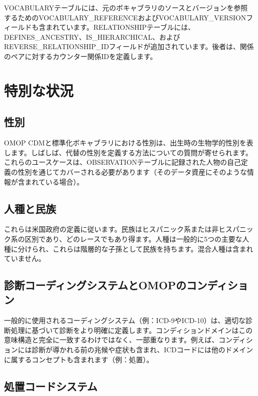 \documentclass[
  11pt]{book}
\theoremstyle{definition}
\theoremstyle{definition}
\theoremstyle{definition}
\theoremstyle{definition}
\theoremstyle{remark}
\begin{document}
VOCABULARYテーブルには、元のボキャブラリのソースとバージョンを参照するためのVOCABULARY\_REFERENCEおよびVOCABULARY\_VERSIONフィールドも含まれています。RELATIONSHIPテーブルには、DEFINES\_ANCESTRY、IS\_HIERARCHICAL、およびREVERSE\_RELATIONSHIP\_IDフィールドが追加されています。後者は、関係のペアに対するカウンター関係IDを定義します。

\section{特別な状況}\label{specialSituations}

\subsection{性別}\label{ux6027ux5225}

OMOP CDMと標準化ボキャブラリにおける性別は、出生時の生物学的性別を表します。しばしば、代替の性別を定義する方法についての質問が寄せられます。これらのユースケースは、OBSERVATIONテーブルに記録された人物の自己定義の性別を通じてカバーされる必要があります（そのデータ資産にそのような情報が含まれている場合）。

\subsection{人種と民族}\label{ux4ebaux7a2eux3068ux6c11ux65cf}

これらは米国政府の定義に従います。民族はヒスパニック系または非ヒスパニック系の区別であり、どのレースでもあり得ます。人種は一般的に5つの主要な人種に分けられ、これらは階層的な子孫として民族を持ちます。混合人種は含まれていません。

\subsection{診断コーディングシステムとOMOPのコンディション}\label{ux8a3aux65adux30b3ux30fcux30c7ux30a3ux30f3ux30b0ux30b7ux30b9ux30c6ux30e0ux3068omopux306eux30b3ux30f3ux30c7ux30a3ux30b7ux30e7ux30f3}

一般的に使用されるコーディングシステム（例：ICD-9やICD-10）は、適切な診断処理に基づいて診断をより明確に定義します。コンディションドメインはこの意味構造と完全に一致するわけではなく、一部重なります。例えば、コンディションには診断が導かれる前の兆候や症状も含まれ、ICDコードには他のドメインに属するコンセプトも含まれます（例：処置）。

\subsection{処置コードシステム}\label{ux51e6ux7f6eux30b3ux30fcux30c9ux30b7ux30b9ux30c6ux30e0}
\end{document}
